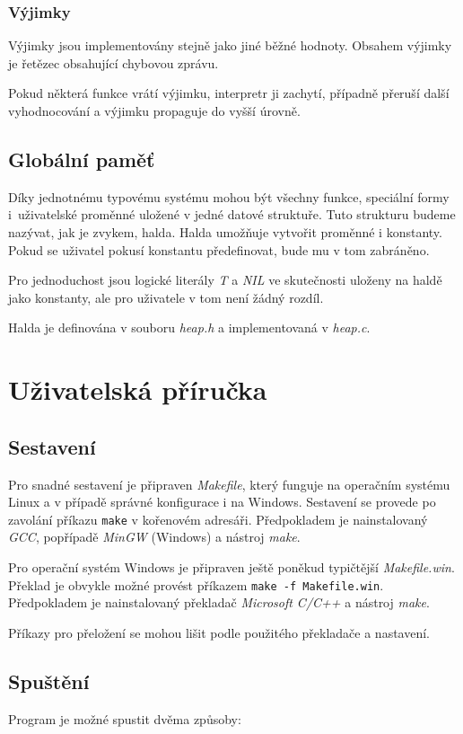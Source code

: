 \documentclass[12pt, a4paper]{report}
\begin{document}
\subsection{Výjimky}
Výjimky jsou implementovány stejně jako jiné běžné hodnoty. Obsahem výjimky je řetězec obsahující chybovou zprávu.

Pokud některá funkce vrátí výjimku, interpretr ji zachytí, případně přeruší další vyhodnocování a výjimku propaguje do vyšší úrovně.

\section{Globální paměť}
Díky jednotnému typovému systému mohou být všechny funkce, speciální formy i~uživatelské proměnné uložené v jedné datové struktuře. Tuto strukturu budeme nazývat, jak je zvykem, halda. Halda umožňuje vytvořit proměnné i konstanty. Pokud se uživatel pokusí konstantu předefinovat, bude mu v tom zabráněno.

Pro jednoduchost jsou logické literály \emph{T} a \emph{NIL} ve skutečnosti uloženy na haldě jako konstanty, ale pro uživatele v tom není žádný rozdíl.

Halda je definována v souboru \emph{heap.h} a implementovaná v \emph{heap.c}.


\chapter{Uživatelská příručka}

\section{Sestavení}
Pro snadné sestavení je připraven \emph{Makefile}, který funguje na operačním systému Linux a v případě správné konfigurace i na Windows. Sestavení se provede po zavolání příkazu \verb|make| v kořenovém adresáři. Předpokladem je nainstalovaný \emph{GCC}, popřípadě \emph{MinGW} (Windows) a nástroj \emph{make}.

Pro operační systém Windows je připraven ještě poněkud typičtější \emph{Makefile.win}. Překlad je obvykle možné provést příkazem \verb|make -f Makefile.win|. Předpokladem je nainstalovaný překladač \emph{Microsoft C/C++} a nástroj \emph{make}.

Příkazy pro přeložení se mohou lišit podle použitého překladače a nastavení.

\section{Spuštění}
Program je možné spustit dvěma způsoby:
\end{document}

